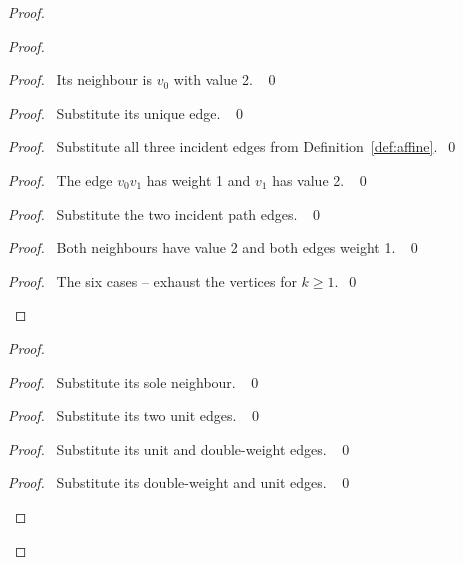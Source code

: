 \begin{proof}
\begin{proof}
\begin{proof}\pf\ Its neighbour is $v_0$ with value 2. ~\qed\end{proof}
\begin{proof}\pf\ Substitute its unique edge. ~\qed\end{proof}
\begin{proof}\pf\ Substitute all three incident edges from
Definition~\ref{def:affine}.~\qed\end{proof}
\begin{proof}\pf\ The edge $v_0v_1$ has weight 1 and $v_1$ has value 2. ~\qed\end{proof}
\begin{proof}\pf\ Substitute the two incident path edges. ~\qed\end{proof}
\begin{proof}\pf\ Both neighbours have value 2 and both edges weight 1. ~\qed\end{proof}
\qedstep
\begin{proof}\pf\ The six cases --
exhaust the vertices for $k\geq1$.~\qed\end{proof}
\end{proof}
\begin{proof}
\begin{proof}\pf\ Substitute its sole neighbour. ~\qed\end{proof}
\begin{proof}\pf\ Substitute its two unit edges. ~\qed\end{proof}
\begin{proof}\pf\ Substitute its unit and double-weight edges. ~\qed\end{proof}
\begin{proof}\pf\ Substitute its double-weight and unit edges. ~\qed\end{proof}

\end{proof}
\end{proof}
